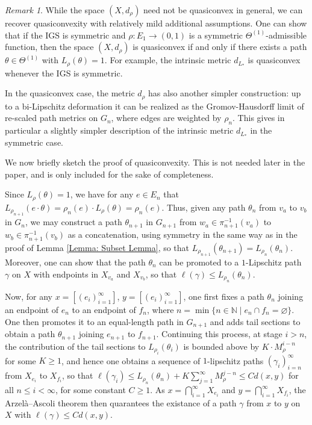 \documentclass{amsart}
\numberwithin{equation}{section}
\theoremstyle{definition}
\theoremstyle{remark}
\newtheorem{remark}[equation]{Remark}
\newcommand{\N}{\mathbb{N}}
\begin{document}
\begin{remark}\label{rmk:quasiconvex}
    While the space \((X,d_\rho)\) need not be quasiconvex in general, we can recover quasiconvexity with relatively mild additional assumptions. One can show that if the IGS is symmetric and \(\rho\colon E_1\to (0,1)\) is a symmetric \(\Theta^{(1)}\)-admissible function, then the space \((X,d_\rho)\) is quasiconvex if and only if there exists a path \(\theta\in\Theta^{(1)}\) with \(L_\rho(\theta)=1\). For example, the intrinsic metric $d_{L_*}$ is quasiconvex whenever the IGS is symmetric.

    In the quasiconvex case, the metric $d_\rho$ has also another simpler construction: up to a bi-Lipschitz deformation it can be realized as the Gromov-Hausdorff limit of re-scaled path metrics on $G_n$, where edges are weighted by $\rho_n$. This gives in particular a slightly simpler description of the intrinsic metric $d_{L_*}$ in the symmetric case.

     We now briefly sketch the proof of quasiconvexity. This is not needed later in the paper, and is only included for the sake of completeness.

    
\end{remark}

    Since \(L_\rho(\theta)=1\), we have for any \(e\in E_n\) that \(L_{\rho_{n+1}}(e\cdot \theta)=\rho_n(e)\cdot L_\rho(\theta)=\rho_n(e)\). Thus, given any path \(\theta_n\) from \(v_a\) to \(v_b\) in \(G_n\), we may construct a path \(\theta_{n+1}\) in \(G_{n+1}\) from \(w_a\in\pi^{-1}_{n+1}(v_a)\) to \(w_b\in \pi^{-1}_{n+1}(v_b)\) as a concatenation, using symmetry in the same way as in the proof of Lemma \ref{Lemma: Subset Lemma}, so that \(L_{\rho_{n+1}}(\theta_{n+1})=L_{\rho_n}(\theta_n)\). Moreover, one can show that the path \(\theta_n\) can be promoted to a \(1\)-Lipschitz path \(\gamma\) on \(X\) with endpoints in \(X_{v_a}\) and \(X_{v_b}\), so that \(\ell(\gamma)\leq L_{\rho_n}(\theta_n)\).

    Now, for any \(x=[(e_i)_{i=1}^\infty]\), \(y=[(e_i)_{i=1}^\infty]\), one first fixes a path \(\theta_n\) joining an endpoint of \(e_n\) to an endpoint of \(f_n\), where \(n=\min\{n\in\N\mid e_n\cap f_n=\varnothing\}\). One then promotes it to an equal-length path in \(G_{n+1}\) and adds tail sections to obtain a path \(\theta_{n+1}\) joining \(e_{n+1}\) to \(f_{n+1}\). Continuing this process, at stage \(i>n\), the contribution of the tail sections to \(L_{\rho_i}(\theta_{i})\) is bounded above by \(K\cdot M_\rho^{i-n}\) for some \(K\geq 1\), and hence one obtains a sequence of \(1\)-lipschitz paths \((\gamma_i)_{i=n}^\infty\) from \(X_{e_i}\) to \(X_{f_i}\), so that \(\ell(\gamma_i)\leq L_{\rho_n}(\theta_n)+K\sum_{j=1}^\infty M_\rho^{j-n}\leq Cd(x,y)\) for all \(n\leq i<\infty\), for some constant \(C\geq 1\). As \(x=\bigcap_{i=1}^\infty X_{e_i}\) and \(y=\bigcap_{i=1}^\infty X_{f_i}\), the Arzelà–Ascoli theorem then quarantees the existance of a path \(\gamma\) from \(x\) to \(y\) on \(X\) with \(\ell(\gamma)\leq Cd(x,y)\).
\end{document}
